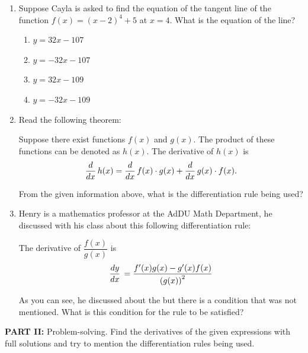 \documentclass[10pt,paper=letter]{scrartcl}
\begin{document}
\begin{enumerate}[label=\arabic*.,font=\bfseries]

\item Suppose Cayla is asked to find the equation of the tangent line of the function $f(x) = (x-2)^4 + 5$ at $x=4$. What is the equation of the line?

\begin{enumerate}
    \item[(a)] $y=32x-107$
    \item[(b)] $y=-32x-107$
    \item[(c)] $y=32x-109$
    \item[(d)] $y=-32x-109$




\end{enumerate}
\item Read the following theorem: 

\begin{thmboxed} 

Suppose there exist functions $f(x)$ and $g(x)$. The product of these functions can be denoted as $h(x)$. The derivative of $h(x)$ is $$\frac{d}{dx}\, h(x) = \frac{d}{dx}\, f(x) \cdot g(x) + \frac{d}{dx}\, g(x) \cdot f(x).$$

\end{thmboxed}

From the given information above, what is the differentiation rule being used?


\newpage

\item Henry is a mathematics professor at the AdDU Math Department, he discussed with his class about this following differentiation rule:

\begin{thmboxed}
The derivative of $\dfrac{f(x)}{g(x)}$ is $$\frac{dy}{dx}\, = \dfrac{f'(x)g(x) - g'(x)f(x)}{\left(g(x)\right)^2}$$
\end{thmboxed}

As you can see, he discussed about the  but there is a condition that was not mentioned. What is this condition for the rule to be satisfied?



\end{enumerate}

\raggedright \textbf{PART II:} Problem-solving. Find the derivatives of the given expressions with full solutions and try to mention the differentiation rules being used.
\end{document}
